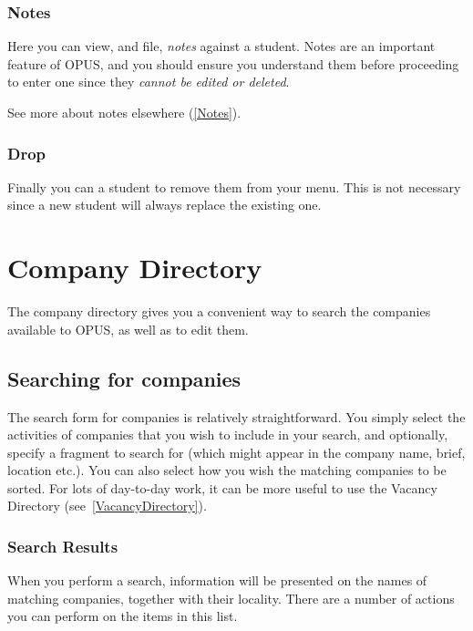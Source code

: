\documentclass[12 pt]{book}
\begin{document}
\subsection{Notes}

Here you can view, and file, \emph{notes} against a student. Notes are an
important feature of OPUS, and you should ensure you understand them before
proceeding to enter one since they \emph{cannot be edited or deleted}.

See more about notes elsewhere (\ref{Notes}).

\subsection{Drop}

Finally you can  a student to remove them from your menu. This is
not necessary since a new student will always replace the existing one.

%
%
%

\chapter{Company Directory}
\label{CompanyDirectory}

The company directory gives you a convenient way to search the companies
available to OPUS, as well as to edit them.

\section{Searching for companies}

The search form for companies is relatively straightforward. You simply select
the activities of companies that you wish to include in your search, and
optionally, specify a fragment to search for (which might appear in the
company name, brief, location etc.). You can also select how you wish the
matching companies to be sorted. For lots of day-to-day work, it can be
more useful to use the Vacancy Directory (see~\ref{VacancyDirectory}).

\subsection{Search Results}

When you perform a search, information will be presented on the names of
matching companies, together with their locality. There are a number of 
actions you can perform on the items in this list.
\end{document}
